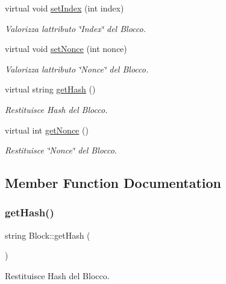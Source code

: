 \begin{DoxyCompactItemize}
virtual void \mbox{\hyperlink{class_block_a08fb67d8f1908100a324601d4c185b54}{set\+Index}} (int index)
\begin{DoxyCompactList}\small\item\em Valorizza l\textquotesingle{}attributo \char`\"{}\+Index\char`\"{} del Blocco. \end{DoxyCompactList}\item 
virtual void \mbox{\hyperlink{class_block_afe8d6e723262945cd8d2fd5316afda06}{set\+Nonce}} (int nonce)
\begin{DoxyCompactList}\small\item\em Valorizza l\textquotesingle{}attributo \char`\"{}\+Nonce\char`\"{} del Blocco. \end{DoxyCompactList}\item 
virtual string \mbox{\hyperlink{class_block_ab33d385c1a9abc82dcdd4e0b9d4cf34c}{get\+Hash}} ()
\begin{DoxyCompactList}\small\item\em Restituisce Hash del Blocco. \end{DoxyCompactList}\item 
virtual int \mbox{\hyperlink{class_block_a3852419958b657cf9e119fb537d01609}{get\+Nonce}} ()
\begin{DoxyCompactList}\small\item\em Restituisce \char`\"{}\+Nonce\char`\"{} del Blocco. \end{DoxyCompactList}\end{DoxyCompactItemize}


\subsection{Member Function Documentation}
\mbox{\label{class_block_ab33d385c1a9abc82dcdd4e0b9d4cf34c}} 
\subsubsection{\texorpdfstring{get\+Hash()}{getHash()}}
{\footnotesize\ttfamily string Block\+::get\+Hash (\begin{DoxyParamCaption}{ }\end{DoxyParamCaption})\hspace{0.3cm}{\ttfamily [virtual]}}



Restituisce Hash del Blocco. 


